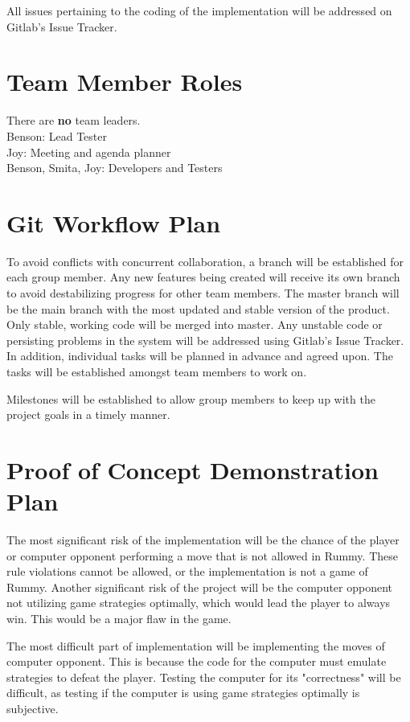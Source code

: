 \documentclass[12pt]{article}
\begin{document}
All issues pertaining to the coding of the implementation will be addressed on Gitlab's Issue Tracker.

\section{Team Member Roles}
There are \textbf{no} team leaders. \\
Benson: Lead Tester \\
Joy: Meeting and agenda planner \\
Benson, Smita, Joy: Developers and Testers

\section{Git Workflow Plan}
To avoid conflicts with concurrent collaboration, a branch will be established for each group member. Any new features being created will receive its own branch to avoid destabilizing progress for other team members. The master branch will be the main branch with the most updated and stable version of the product. Only stable, working code will be merged into master. Any unstable code or persisting problems in the system will be addressed using Gitlab's Issue Tracker. In addition, individual tasks will be planned in advance and agreed upon. The tasks will be established amongst team members to work on. 

Milestones will be established to allow group members to keep up with the project goals in a timely manner.

\section{Proof of Concept Demonstration Plan}
The most significant risk of the implementation will be the chance of the player or computer opponent performing a move that is not allowed in Rummy. These rule violations cannot be allowed, or the implementation is not a game of Rummy.
Another significant risk of the project will be the computer opponent not utilizing game strategies optimally, which would lead the player to always win. This would be a major flaw in the game.

The most difficult part of implementation will be implementing the moves of computer opponent. This is because the code for the computer must emulate strategies to defeat the player. Testing the computer for its "correctness" will be difficult, as testing if the computer is using game strategies optimally is subjective. 
\end{document}
